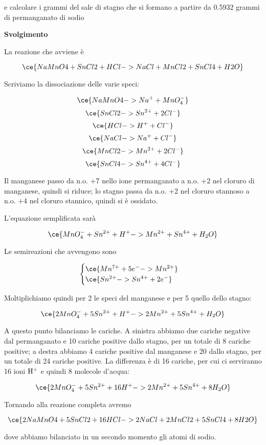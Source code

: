 e calcolare i grammi del sale di stagno che si formano a partire da 0.5932 grammi di permanganato di sodio

\vspace{0.2cm}\large\textbf{Svolgimento}\normalsize

\vspace{0.2cm}La reazione che avviene è

$$\ce{NaMnO4 + SnCl2 + HCl -> NaCl + MnCl2 + SnCl4 + H2O}$$

Scriviamo la dissociazione delle varie speci:

$$\ce{NaMnO4 -> Na^+ + MnO_4^-}$$
$$\ce{SnCl2 -> Sn^{2+} + 2Cl^-}$$
$$\ce{HCl -> H^+ + Cl^-}$$
$$\ce{NaCl -> Na^+ + Cl^-}$$
$$\ce{MnCl2 -> Mn^{2+} + 2Cl^-}$$
$$\ce{SnCl4 -> Sn^{4+} + 4Cl^-}$$

Il manganese passo da n.o. +7 nello ione permanganato a n.o. +2 nel cloruro di
manganese, quindi si riduce; lo stagno passa da n.o. +2 nel cloruro stannoso a n.o. +4 nel cloruro stannico, quindi si è ossidato.

L'equazione semplificata sarà

$$\ce{MnO_4^- + Sn^{2+} + H^+ -> Mn^{2+} + Sn^{4+} + H_2O}$$

Le semireazioni che avvengono sono

$$\begin{cases}
    \ce{Mn^{7+} + 5e^- -> Mn^{2+}}\\
    \ce{Sn^{2+} -> Sn^{4+} + 2e^-}
\end{cases}$$

Moltiplichiamo quindi per 2 le speci del manganese e per 5 quello dello stagno:

$$\ce{2MnO_4^- + 5Sn^{2+} + H^+ -> 2Mn^{2+} + 5Sn^{4+} + H_2O}$$

A questo punto bilanciamo le cariche. A sinistra abbiamo due cariche negative dal permanganato e 10 cariche positive dallo stagno, per un totale di 8 cariche positive; a destra abbiamo 4 cariche positive dal manganese e 20 dallo stagno, per un totale di 24 cariche positive. La differenza è di 16 cariche, per cui ci serviranno 16 ioni $\rm H^+$ e quindi 8 molecole d'acqua: 

$$\ce{2MnO_4^- + 5Sn^{2+} + 16H^+ -> 2Mn^{2+} + 5Sn^{4+} + 8H_2O}$$

Tornando alla reazione completa avremo

$$\ce{2NaMnO4 + 5SnCl2 + 16HCl -> 2NaCl + 2MnCl2 + 5SnCl4 + 8H2O}$$

dove abbiamo bilanciato in un secondo momento gli atomi di sodio.

